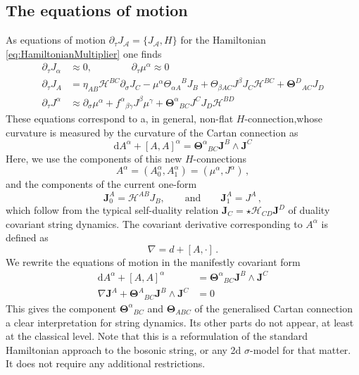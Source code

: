 \documentclass[11pt,a4paper]{article}
\numberwithin{equation}{section}
\begin{document}
\subsection{The equations of motion}
As equations of motion $\partial_\tau J_\mathcal{A} = \{ J_\mathcal{A} , H \}$ for the Hamiltonian \eqref{eq:HamiltonianMultiplier} one finds
\begin{align*}
\partial_\tau J_\alpha &\approx 0, \qquad\qquad \partial_\tau \mu^\alpha \approx 0 \\
\partial_\tau J_A &= \eta_{AB} \mathcal{H}^{BC} \partial_\sigma J_C - \mu^\alpha {\Theta_{\alpha A}}^B J_B + \Theta_{\beta AC} J^\beta J_C \mathcal{H}^{BC} + \mathbf{\Theta}^D{}_{AC} J_D \\
\partial_\tau J^\alpha &\approx \partial_\sigma \mu^\alpha + {f^\alpha}_{\beta \gamma} J^\beta \mu^\gamma + {\mathbf{\Theta}^\alpha}_{BC} J^C J_D \mathcal{H}^{BD}
\end{align*}
These equations correspond to a, in general, non-flat $H$-connection,whose curvature is measured by the curvature of the Cartan connection as
\begin{equation}
	\mathrm{d} A^\alpha + [A , A]^\alpha = {\mathbf{\Theta}^\alpha}_{BC} \mathbf{J}^B \wedge \mathbf{J}^C
\end{equation}
Here, we use the components of this new $H$-connections
\begin{equation}
    A^\alpha = (A_0^\alpha , A_1^\alpha) = (\mu^\alpha , J^\alpha)\,,
\end{equation}
and the components of the current one-form
\begin{equation}
    \mathbf{J}^A_0 = \mathcal{H}^{AB} J_B, 
    \qquad \text{and} \qquad 
    \mathbf{J}^A_1 = J^A\,,
\end{equation}
which follow from the typical self-duality relation $\mathbf{J}_C = \star \mathcal{H}_{CD} \mathbf{J}^D$ of duality covariant string dynamics. The covariant derivative corresponding to $A^\alpha$ is defined as
\begin{equation}
    \nabla = d + [A, \cdot]\,.
\end{equation}
We rewrite the equations of motion in the manifestly covariant form
\begin{equation}\label{eqn:masterCurrentAlgebra}
    \boxed{
    \begin{aligned}
        \mathrm{d} A^\alpha + [A , A]^\alpha &= {\mathbf{\Theta}^\alpha}_{BC} \mathbf{J}^B \wedge \mathbf{J}^C \\
        \nabla \mathbf{J}^A + \mathbf{\Theta}^A{}_{BC} \mathbf{J}^B \wedge     \mathbf{J}^C &= 0    
    \end{aligned}
    }
\end{equation}
This gives the component ${\mathbf{\Theta}^\alpha}_{BC}$ and $\mathbf{\Theta}_{ABC}$ of the generalised Cartan connection a clear interpretation for string dynamics. Its other parts do not appear, at least at the classical level. Note that this is a reformulation of the standard Hamiltonian approach to the bosonic string, or any 2d $\sigma$-model for that matter. It does not require any additional restrictions. 
\end{document}
